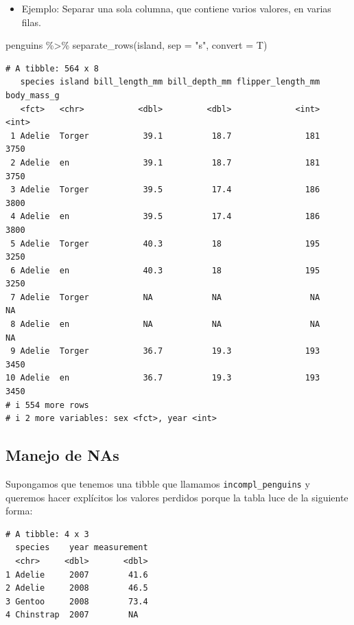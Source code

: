\documentclass[
  letterpaper,
  DIV=11,
  numbers=noendperiod]{scrreprt}
\newenvironment{Shaded}{\begin{snugshade}}{\end{snugshade}}
\newcommand{\AttributeTok}[1]{\textcolor[rgb]{0.40,0.45,0.13}{#1}}
\newcommand{\FunctionTok}[1]{\textcolor[rgb]{0.28,0.35,0.67}{#1}}
\newcommand{\NormalTok}[1]{\textcolor[rgb]{0.00,0.23,0.31}{#1}}
\newcommand{\SpecialCharTok}[1]{\textcolor[rgb]{0.37,0.37,0.37}{#1}}
\newcommand{\StringTok}[1]{\textcolor[rgb]{0.13,0.47,0.30}{#1}}
\providecommand{\tightlist}{%
  \setlength{\itemsep}{0pt}\setlength{\parskip}{0pt}}\usepackage{longtable,booktabs,array}
\begin{document}
\begin{itemize}
\tightlist
\item
  {Ejemplo}: Separar una sola columna, que contiene varios valores, en
  varias filas.
\end{itemize}

\begin{Shaded}
\begin{Highlighting}[]
\NormalTok{penguins }\SpecialCharTok{\%\textgreater{}\%} \FunctionTok{separate\_rows}\NormalTok{(island, }\AttributeTok{sep =} \StringTok{"s"}\NormalTok{, }\AttributeTok{convert =}\NormalTok{ T)}
\end{Highlighting}
\end{Shaded}

\begin{verbatim}
# A tibble: 564 x 8
   species island bill_length_mm bill_depth_mm flipper_length_mm body_mass_g
   <fct>   <chr>           <dbl>         <dbl>             <int>       <int>
 1 Adelie  Torger           39.1          18.7               181        3750
 2 Adelie  en               39.1          18.7               181        3750
 3 Adelie  Torger           39.5          17.4               186        3800
 4 Adelie  en               39.5          17.4               186        3800
 5 Adelie  Torger           40.3          18                 195        3250
 6 Adelie  en               40.3          18                 195        3250
 7 Adelie  Torger           NA            NA                  NA          NA
 8 Adelie  en               NA            NA                  NA          NA
 9 Adelie  Torger           36.7          19.3               193        3450
10 Adelie  en               36.7          19.3               193        3450
# i 554 more rows
# i 2 more variables: sex <fct>, year <int>
\end{verbatim}

\subsection{\texorpdfstring{\textbf{Manejo de
NAs}}{Manejo de NAs}}\label{manejo-de-nas}

Supongamos que tenemos una tibble que llamamos
\texttt{incompl\_penguins} y queremos hacer explícitos los valores
perdidos porque la tabla luce de la siguiente forma:

\begin{verbatim}
# A tibble: 4 x 3
  species    year measurement
  <chr>     <dbl>       <dbl>
1 Adelie     2007        41.6
2 Adelie     2008        46.5
3 Gentoo     2008        73.4
4 Chinstrap  2007        NA  
\end{verbatim}
\end{document}
